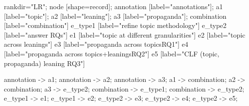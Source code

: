 


 {
    rankdir="LR";
    node [shape=record];
    annotation [label="annotations"];
    a1 [label="topic"];
    a2 [label="leaning"];
    a3 [label="propaganda"];
    combination [label="combination"]
    e_type1 [label="refine topic methodology"]
    e_type2 [label="answer RQs"]
    e1 [label="topic at different granularities"]
    e2 [label="topic across leanings"]
    e3 [label="propaganda across topics\gvnewline RQ1"]
    e4 [label="propaganda across topics+leanings\gvnewline RQ2"]
    e5 [label="CLF (topic, propaganda)  leaning \gvnewline RQ3"]
    
    annotation -> a1;
    annotation -> a2;
    annotation -> a3;
    a1 -> combination;
    a2 -> combination;
    a3 -> e_type2;
    combination -> e_type1;
    combination -> e_type2;
    e_type1 -> e1;
    e_type1 -> e2;
    e_type2 -> e3;
    e_type2 -> e4;
    e_type2 -> e5;
}
